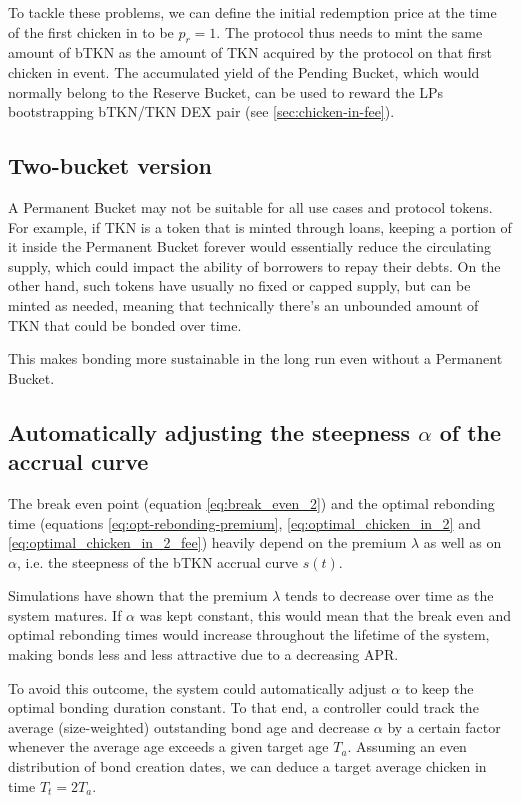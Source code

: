 \documentclass{article}
\begin{document}
To tackle these problems, we can define the initial redemption price at the time of the first chicken in to be $p_r = 1$. The protocol thus needs to mint the same amount of bTKN as the amount of TKN acquired by the protocol on that first chicken in event. The accumulated yield of the Pending Bucket, which would normally belong to the Reserve Bucket, can be used to reward the LPs bootstrapping bTKN/TKN DEX pair (see \ref{sec:chicken-in-fee}).

\subsection{Two-bucket version}
\label{sec:two-bucket}
A Permanent Bucket may not be suitable for all use cases and protocol tokens. For example, if TKN is a token that is minted through loans, keeping a portion of it inside the Permanent Bucket forever would essentially reduce the circulating supply, which could impact the ability of borrowers to repay their debts. On the other hand, such tokens have usually no fixed or capped supply, but can be minted as needed, meaning that technically there's an unbounded amount of TKN that could be bonded over time.

This makes bonding more sustainable in the long run even without a Permanent Bucket.


\subsection{Automatically adjusting the steepness $\alpha$ of the accrual curve}
  \label{sec:adjustment}
The break even point (equation \ref{eq:break_even_2}) and the optimal rebonding time (equations \ref{eq:opt-rebonding-premium}, \ref{eq:optimal_chicken_in_2} and \ref{eq:optimal_chicken_in_2_fee}) heavily depend on the premium $\lambda$ as well as on $\alpha$, i.e. the steepness of the bTKN accrual curve $s(t)$. 

Simulations have shown that the premium $\lambda$ tends to decrease over time as the system matures. If  $\alpha$ was kept constant, this would mean that the break even and optimal rebonding times would increase throughout the lifetime of the system, making bonds less and less attractive due to a decreasing APR.

To avoid this outcome, the system could automatically adjust $\alpha$ to keep the optimal bonding duration constant. To that end, a controller could track the average (size-weighted) outstanding bond age and decrease $\alpha$ by a certain factor whenever the average age exceeds a given target age $T_a$. Assuming an even distribution of bond creation dates, we can deduce a target average chicken in time $T_t = 2T_a$.
\end{document}
